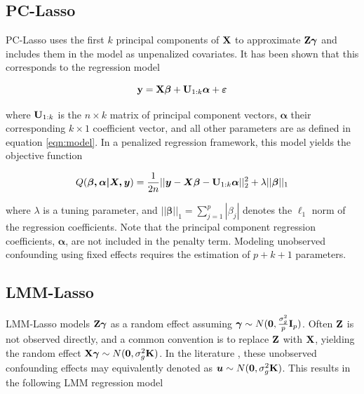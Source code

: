 \subsection{PC-Lasso}
PC-Lasso uses the first $k$ principal components of $\textbf{X}$ to approximate $\textbf{Z}\boldsymbol{\gamma}$ and includes them in the model as unpenalized covariates. It has been shown \cite{hoffman2013correcting} that this corresponds to the regression model

\begin{equation}
    \label{eqn:pca_reg}
    \textbf{y} = \textbf{X}\boldsymbol{\beta} + \textbf{U}_{1:k}\boldsymbol{\alpha} + \boldsymbol{\varepsilon} 
\end{equation}

where $\textbf{U}_{1:k}$ is the $n \times k$ matrix of principal component vectors, $\boldsymbol{\alpha}$ their corresponding $k \times 1$ coefficient vector, and all other parameters are as defined in equation \ref{eqn:model}. In a penalized regression framework, this model yields the objective function

\begin{equation}
    \label{eqn:pca_obj}
    Q(\boldsymbol{\beta, \alpha| X, y}) = \frac{1}{2n} ||\boldsymbol{y} - \boldsymbol{X \beta} - \textbf{U}_{1:k}\boldsymbol{\alpha}||_2^2 + \lambda || \boldsymbol{\beta} ||_1
\end{equation}

where $\lambda$ is a tuning parameter, and $|| \boldsymbol{\beta} ||_1 = \sum_{j=1}^p |\beta_j|$ denotes the $\ell_1$ norm of the regression coefficients.  Note that the principal component regression coefficients, $\boldsymbol{\alpha}$, are not included in the penalty term. Modeling unobserved confounding using fixed effects requires the estimation of $p + k + 1$ parameters. 


\subsection{LMM-Lasso}
LMM-Lasso models $\textbf{Z}\boldsymbol{\gamma}$ as a random effect assuming $\boldsymbol{\gamma} \sim N(\boldsymbol{0}, \frac{\sigma^2_g}{p} \textbf{I}_p)$. Often $\textbf{Z}$ is not observed directly, and a common convention is to replace $\textbf{Z}$ with $\textbf{X}$, yielding the random effect $\textbf{X}\boldsymbol{\gamma} \sim N(\boldsymbol{0}, \sigma^2_g \textbf{K})$. In the literature \cite{Rakitsch2012}, these unobserved confounding effects may equivalently denoted as $\boldsymbol{u} \sim N(\boldsymbol{0}, \sigma^2_g \textbf{K})$. This results in the following LMM regression model


